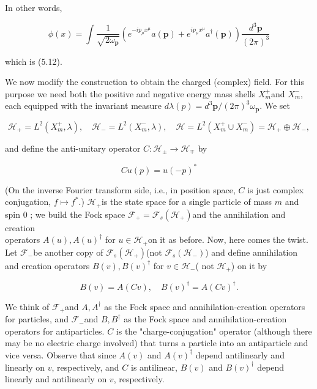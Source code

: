 \documentclass[10pt, letterpaper]{article}
\begin{document}
In other words,

$$
\phi(x)=\int \frac{1}{\sqrt{2 \omega_{\mathbf{p}}}}\left(e^{-i p_{\mu} x^{\mu}} a(\mathbf{p})+e^{i p_{\mu} x^{\mu}} a^{\dagger}(\mathbf{p})\right) \frac{d^{3} \mathbf{p}}{(2 \pi)^{3}}
$$

which is (5.12).

\pagebreak


We now modify the construction to obtain the charged (complex) field. For this purpose we need both the positive and negative energy mass shells $X_{m}^{+}$and $X_{m}^{-}$, each equipped with the invariant measure $d \lambda(p)=d^{3} \mathbf{p} /(2 \pi)^{3} \omega_{\mathbf{p}}$. We set

$$
\mathcal{H}_{+}=L^{2}\left(X_{m}^{+}, \lambda\right), \quad \mathcal{H}_{-}=L^{2}\left(X_{m}^{-}, \lambda\right), \quad \mathcal{H}=L^{2}\left(X_{m}^{+} \cup X_{m}^{-}\right)=\mathcal{H}_{+} \oplus \mathcal{H}_{-},
$$

and define the anti-unitary operator $C: \mathcal{H}_{ \pm} \rightarrow \mathcal{H}_{\mp}$ by

$$
C u(p)=u(-p)^{*}
$$

(On the inverse Fourier transform side, i.e., in position space, $C$ is just complex conjugation, $f \mapsto f^{*}$.) $\mathcal{H}_{+}$is the state space for a single particle of mass $m$ and spin 0 ; we build the Fock space $\mathcal{F}_{+}=\mathcal{F}_{s}\left(\mathcal{H}_{+}\right)$and the annihilation and creation\\
operators $A(u), A(u)^{\dagger}$ for $u \in \mathcal{H}_{+}$on it as before. Now, here comes the twist. Let $\mathcal{F}_{-}$be another copy of $\mathcal{F}_{s}\left(\mathcal{H}_{+}\right)$(not $\mathcal{F}_{s}\left(\mathcal{H}_{-}\right)$) and define annihilation and creation operators $B(v), B(v)^{\dagger}$ for $v \in \mathcal{H}_{-}$( not $\mathcal{H}_{+}$) on it by

$$
B(v)=A(C v), \quad B(v)^{\dagger}=A(C v)^{\dagger} .
$$

We think of $\mathcal{F}_{+}$and $A, A^{\dagger}$ as the Fock space and annihilation-creation operators for particles, and $\mathcal{F}_{-}$and $B, B^{\dagger}$ as the Fock space and annihilation-creation operators for antiparticles. $C$ is the "charge-conjugation" operator (although there may be no electric charge involved) that turns a particle into an antiparticle and vice versa. Observe that since $A(v)$ and $A(v)^{\dagger}$ depend antilinearly and linearly on $v$, respectively, and $C$ is antilinear, $B(v)$ and $B(v)^{\dagger}$ depend linearly and antilinearly on $v$, respectively.
\end{document}

